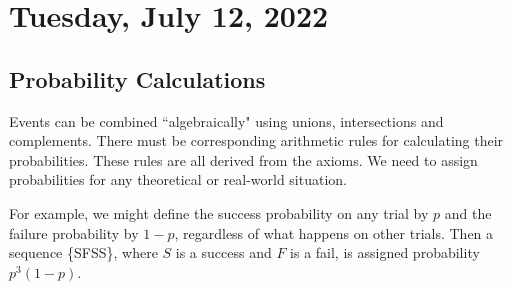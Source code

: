 \section{Tuesday, July 12, 2022}

\subsection{Probability Calculations}
Events can be combined ``algebraically" using unions, intersections and complements. There must be corresponding arithmetic rules for calculating their probabilities. These rules are all derived from the axioms. We need to assign probabilities for any theoretical or real-world situation.

For example, we might define the success probability on any trial by $p$ and the failure probability by $1-p$, regardless of what happens on other trials. Then a sequence \{SFSS\}, where $S$ is a success and $F$ is a fail, is assigned probability $p^3(1-p)$.\\

